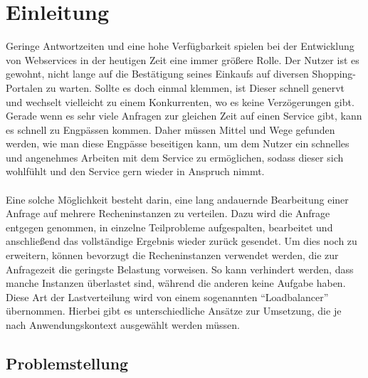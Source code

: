 \section{Einleitung}
Geringe Antwortzeiten und eine hohe Verfügbarkeit spielen bei der Entwicklung von Webservices in der heutigen Zeit eine immer größere Rolle. Der Nutzer ist es gewohnt, nicht lange auf die Bestätigung seines Einkaufs auf diversen Shopping-Portalen zu warten. Sollte es doch einmal klemmen, ist Dieser schnell genervt und wechselt vielleicht zu einem Konkurrenten, wo es keine Verzögerungen gibt. Gerade wenn es sehr viele Anfragen zur gleichen Zeit auf einen Service gibt, kann es schnell zu Engpässen kommen. Daher müssen Mittel und Wege gefunden werden, wie man diese Engpässe beseitigen kann, um dem Nutzer ein schnelles und angenehmes Arbeiten mit dem Service zu ermöglichen, sodass dieser sich wohlfühlt und den Service gern wieder in Anspruch nimmt.
\\
\\
Eine solche Möglichkeit besteht darin, eine lang andauernde Bearbeitung einer Anfrage auf mehrere Recheninstanzen zu verteilen. Dazu wird die Anfrage entgegen genommen, in einzelne Teilprobleme aufgespalten, bearbeitet und anschließend das vollständige Ergebnis wieder zurück gesendet. Um dies noch zu erweitern, können bevorzugt die Recheninstanzen verwendet werden, die zur Anfragezeit die geringste Belastung vorweisen. So kann verhindert werden, dass manche Instanzen überlastet sind, während die anderen keine Aufgabe haben. Diese Art der Lastverteilung wird von einem sogenannten "`Loadbalancer"' übernommen. Hierbei gibt es unterschiedliche Ansätze \cite{loadb1}\cite{loadb2} zur Umsetzung, die je nach Anwendungskontext ausgewählt werden müssen.

\subsection{Problemstellung}
